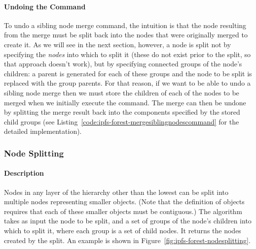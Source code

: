 \paragraph{Undoing the Command}

To undo a sibling node merge command, the intuition is that the node resulting from the merge must be split back into the nodes that were originally merged to create it. As we will see in the next section, however, a node is split not by specifying the \emph{nodes} into which to split it (these do not exist prior to the split, so that approach doesn't work), but by specifying connected groups of the node's children: a parent is generated for each of these groups and the node to be split is replaced with the group parents. For that reason, if we want to be able to undo a sibling node merge then we must store the children of each of the nodes to be merged when we initially execute the command. The merge can then be undone by splitting the merge result back into the components specified by the stored child groups (see Listing~\ref{code:ipfs-forest-mergesiblingnodescommand} for the detailed implementation).

\afterpage{\clearpage}
\newpage

\subsubsection{Node Splitting}

\paragraph{Description}

Nodes in any layer of the hierarchy other than the lowest can be split into multiple nodes representing smaller objects. (Note that the definition of objects requires that each of these smaller objects must be contiguous.) The algorithm takes as input the node to be split, and a set of groups of the node's children into which to split it, where each group is a set of child nodes. It returns the nodes created by the split. An example is shown in Figure~\ref{fig:ipfs-forest-nodesplitting}.

